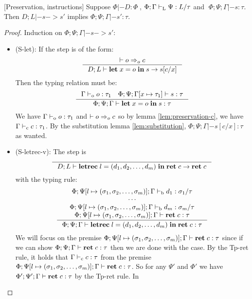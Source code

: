 \documentclass[a4paper, oneside, 10pt, draft]{memoir}
\begin{document}
\begin{lem}{[Preservation, instructions]}
  \label{lem:preservation-i}
  Suppose $\Phi |- D : \Phi \;$, $\Phi;\Gamma |-_{\mathrm{L}} \Psi : L / \tau$ and
  $\; \Phi;\Psi;\Gamma |- s : \tau$. Then $D;L |- s -> s'$ implies
  $\Phi;\Psi;\Gamma |- s' : \tau$.
\end{lem}
\begin{proof}
  Induction on $\Phi;\Psi;\Gamma |- s -> s'$:
  \begin{itemize}
  \item (S-let): If the step is of the form:
    \begin{equation*}
      \inference{|- o \eop c}{D;L |- \ilet{x}{o}{s} -> s[c/x]}
    \end{equation*}
    Then the typing relation must be:
    \begin{equation*}
    \inference{\Gamma \tpop o : \tau_1 \quad \Phi ; \Psi ;
      \Gamma[x \mapsto \tau_1] |- s : \tau}{\Phi ; \Psi ; \Gamma |-
      \ilet{x}{o}{s} : \tau}
    \end{equation*}
    We have $\Gamma |-_{\mathrm{o}} o : \tau_1$ and $|- o =>_{o} c$ so by lemma
    \ref{lem:preservation-c}, we have $\Gamma |-_{\mathrm{c}} c : \tau_1$. By the
    substitution lemma \ref{lem:substitution}, $\Phi;\Psi;\Gamma |-
    s[c/x] : \tau$ as wanted.
  \item (S-letrec-v):
    The step is
    \begin{equation*}
      \inference{}{D;L |- \iletrec{l}{\dbundle}
        {\iret{c}} -> \iret{c}}
    \end{equation*}
    with the typing rule:
    \begin{equation*}
    \inference{\Phi;\Psi[l \mapsto \bbtypes];\Gamma \tpb d_1 :
      \sigma_1 / \tau\\
      \dotsb\\
      \Phi;\Psi[l \mapsto \bbtypes];\Gamma \tpb d_m : \sigma_m / \tau\\
      \Phi;\Psi[l \mapsto \bbtypes];\Gamma |- \iret{c} : \tau}
       {\Phi;\Psi;\Gamma |- \iletrec{l}{\dbundle}{\iret{c}} : \tau}
    \end{equation*}
    We will focus on the premise $\Phi;\Psi[l \mapsto (\sigma_1, \sigma_2, \dotsc, \sigma_m)];\Gamma
    |- \mathbf{ret} \; c : \tau$  since if we can show $\Phi;\Psi;\Gamma |-
    \mathbf{ret} \; c : \tau$ then we are done with the case. By the Tp-ret
    rule, it holds that $\Gamma |-_{\mathrm{c}} c : \tau$ from the premise $\Phi;\Psi[l \mapsto (\sigma_1, \sigma_2, \dotsc, \sigma_m)];\Gamma
    |- \mathbf{ret} \; c : \tau$. So for any $\Psi'$ and $\Phi'$ we have
    $\Phi';\Psi';\Gamma |- \mathbf{ret} \; c : \tau$ by the Tp-ret rule. In

\end{itemize}
\end{proof}
\end{document}
